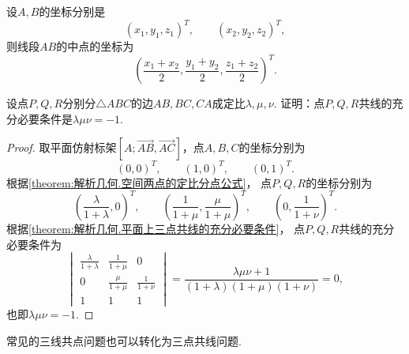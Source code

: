 \begin{corollary}
设\(A,B\)的坐标分别是\[
	(x_1,y_1,z_1)^T, \qquad
	(x_2,y_2,z_2)^T,
\]
则线段\(AB\)的中点的坐标为
\begin{equation}
	\left(
		\frac{x_1 + x_2}{2},
		\frac{y_1 + y_2}{2},
		\frac{z_1 + z_2}{2}
	\right)^T.
\end{equation}
\end{corollary}

\begin{example}[门内劳斯定理]
设点\(P,Q,R\)分别分\(\triangle ABC\)的边\(AB,BC,CA\)成定比\(\lambda,\mu,\nu\).
证明：点\(P,Q,R\)共线的充分必要条件是\(\lambda \mu \nu = -1\).
\begin{proof}
取平面仿射标架\([A;\vec{AB},\vec{AC}]\)，点\(A,B,C\)的坐标分别为\[
	(0,0)^T, \qquad
	(1,0)^T, \qquad
	(0,1)^T.
\]
根据\cref{theorem:解析几何.空间两点的定比分点公式}，
点\(P,Q,R\)的坐标分别为\[
	\left(\frac{\lambda}{1+\lambda},0\right)^T, \qquad
	\left(\frac{1}{1+\mu},\frac{\mu}{1+\mu}\right)^T, \qquad
	\left(0,\frac{1}{1+\nu}\right)^T.
\]
根据\cref{theorem:解析几何.平面上三点共线的充分必要条件}，
点\(P,Q,R\)共线的充分必要条件为\[
	\begin{vmatrix}
		\frac{\lambda}{1+\lambda} & \frac{1}{1+\mu} & 0 \\
		0 & \frac{\mu}{1+\mu} & \frac{1}{1+\nu} \\
		1 & 1 & 1
	\end{vmatrix}
	= \frac{\lambda \mu \nu + 1}{(1+\lambda)(1+\mu)(1+\nu)}
	= 0,
\]也即\(\lambda \mu \nu = -1\).
\end{proof}
\end{example}

常见的三线共点问题也可以转化为三点共线问题.

